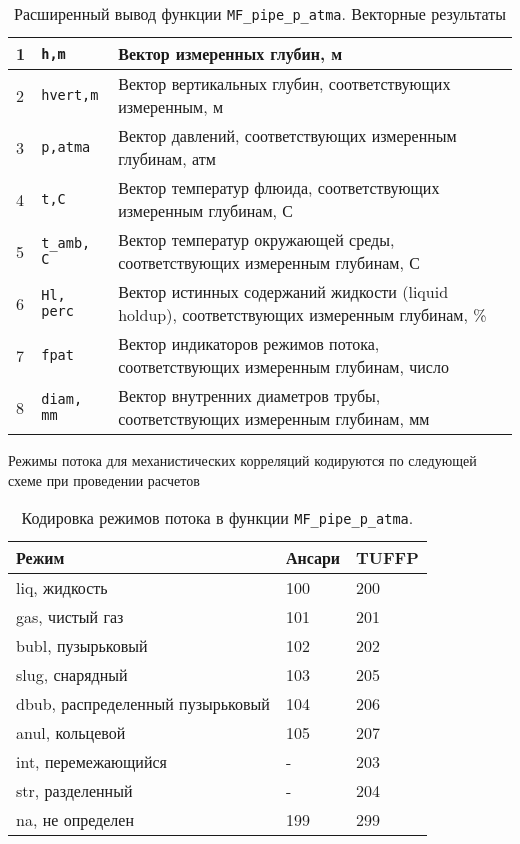 \begin{table}[H]
	\caption{Расширенный вывод функции \texttt{MF_pipe_p_atma}. Векторные результаты}
	\label{table:res_list_pipe_crv}
	\begin{tabular}{p{}p{}p{}}
		1 & \texttt{h,m} & Вектор измеренных глубин, м   \\ \hline
		
		2 & \texttt{hvert,m} & Вектор вертикальных глубин, соответствующих измеренным, м   \\ \hline
		3 & \texttt{p,atma} & Вектор давлений, соответствующих измеренным глубинам, атм   \\ \hline
		4 & \texttt{t,C} & Вектор температур флюида, соответствующих измеренным глубинам, С   \\ \hline
		5 & \texttt{t_amb, C} & Вектор температур окружающей среды, соответствующих измеренным глубинам, С   \\ \hline
		6 & \texttt{Hl, perc} & Вектор истинных содержаний жидкости (liquid holdup), соответствующих измеренным глубинам, \%   \\ \hline
		7 & \texttt{fpat} & Вектор индикаторов режимов потока, соответствующих измеренным глубинам, число   \\ \hline
		8 & \texttt{diam, mm} & Вектор внутренних диаметров трубы, соответствующих измеренным глубинам, мм \\ \hline
		
	\end{tabular}
\end{table}

Режимы потока для механистических корреляций кодируются по следующей схеме при проведении расчетов 
\begin{table}[H]
	\caption{Кодировка режимов потока в функции \texttt{MF_pipe_p_atma}. }
	\label{table:res_list_pipe_fpat}
	\begin{tabular}{p{}p{}p{}}
		
		Режим & Ансари & TUFFP\\ \hline
		liq, жидкость & 100 & 200\\ \hline
		gas, чистый газ & 101 & 201\\ \hline
		bubl, пузырьковый & 102 & 202\\ \hline
		slug, снарядный & 103 & 205\\ \hline
		dbub, распределенный пузырьковый & 104 & 206\\ \hline
		anul, кольцевой & 105 & 207\\ \hline
		int, перемежающийся & - & 203\\ \hline
		str, разделенный & - & 204\\ \hline
		na, не определен & 199 & 299\\ \hline
		
		
	\end{tabular}
\end{table}





